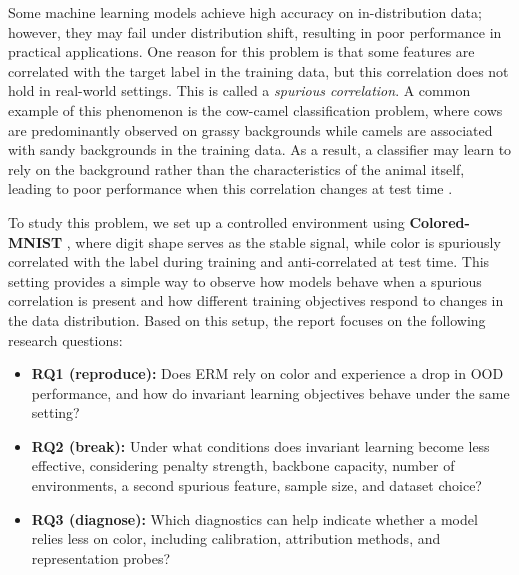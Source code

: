 \documentclass[12pt,a4paper]{article}
\begin{document}
Some machine learning models achieve high accuracy on in-distribution data; 
however, they may fail under distribution shift, resulting in poor 
performance in practical applications. One reason for this problem is that some 
features are correlated with the target label in the training data, but this 
correlation does not hold in real-world settings. 
This is called a \emph{spurious correlation}. A common example of this phenomenon 
is the cow-camel classification problem, where cows are predominantly observed 
on grassy backgrounds while camels are associated with sandy backgrounds in the 
training data. As a result, a classifier may learn to rely on the background 
rather than the characteristics of the animal itself, leading to poor performance 
when this correlation changes at test time \citep{nagarajan2021understanding}.

To study this problem, we set up a controlled environment using \textbf{Colored-MNIST}
\citep{arjovsky2019irm}, where digit shape serves as the stable signal, while
color is spuriously correlated with the label during training and anti-correlated
at test time. This setting provides a simple way to observe how models behave when
a spurious correlation is present and how different training objectives respond to
changes in the data distribution. Based on this setup, the report focuses on the
following research questions:

\begin{itemize}
\item \textbf{RQ1 (reproduce):} Does ERM rely on color and experience a drop in OOD performance, 
and how do invariant learning objectives behave under the same setting?
\item \textbf{RQ2 (break):} Under what conditions does invariant learning become less 
effective, considering penalty strength, backbone capacity, number of environments, 
a second spurious feature, sample size, and dataset choice?
\item \textbf{RQ3 (diagnose):} Which diagnostics can help indicate whether a model relies 
less on color, including calibration, attribution methods, and representation probes?
\end{itemize}
\end{document}
